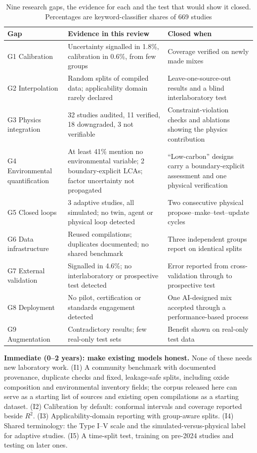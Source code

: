 \documentclass[pdflatex,sn-basic]{sn-jnl}
\begin{document}
\begin{table}[htbp]
\caption{Nine research gaps, the evidence for each and the test that would show it closed. Percentages are keyword-classifier shares of 669 studies}\label{tab:gaps}
\centering
{\footnotesize
\begin{tabular}{p{}p{}p{}}
\toprule
Gap & Evidence in this review & Closed when \\
\midrule
G1 Calibration & Uncertainty signalled in 1.8\%, calibration in 0.6\%, from few groups & Coverage verified on newly made mixes \\
G2 Interpolation & Random splits of compiled data; applicability domain rarely declared & Leave-one-source-out results and a blind interlaboratory test \\
G3 Physics integration & 32 studies audited, 11 verified, 18 downgraded, 3 not verifiable & Constraint-violation checks and ablations showing the physics contribution \\
G4 Environmental quantification & At least 41\% mention no environmental variable; 2 boundary-explicit LCAs; factor uncertainty not propagated & ``Low-carbon'' designs carry a boundary-explicit assessment and one physical verification \\
G5 Closed loops & 3 adaptive studies, all simulated; no twin, agent or physical loop detected & Two consecutive physical propose--make--test--update cycles \\
G6 Data infrastructure & Reused compilations; duplicates documented; no shared benchmark & Three independent groups report on identical splits \\
G7 External validation & Signalled in 4.6\%; no interlaboratory or prospective test detected & Error reported from cross-validation through to prospective test \\
G8 Deployment & No pilot, certification or standards engagement detected & One AI-designed mix accepted through a performance-based process \\
G9 Augmentation & Contradictory results; few real-only test sets & Benefit shown on real-only test data \\
\bottomrule
\end{tabular}}
\end{table}

\textbf{Immediate (0--2 years): make existing models honest.} None of these needs new laboratory work. (I1) A community benchmark with documented provenance, duplicate checks and fixed, leakage-safe splits, including oxide composition and environmental inventory fields; the corpus released here can serve as a starting list of sources and existing open compilations \citep{morenotorres2023} as a starting dataset. (I2) Calibration by default: conformal intervals and coverage reported beside $R^2$. (I3) Applicability-domain reporting with group-aware splits. (I4) Shared terminology: the Type I--V scale and the simulated-versus-physical label for adaptive studies. (I5) A time-split test, training on pre-2024 studies and testing on later ones.
\end{document}
